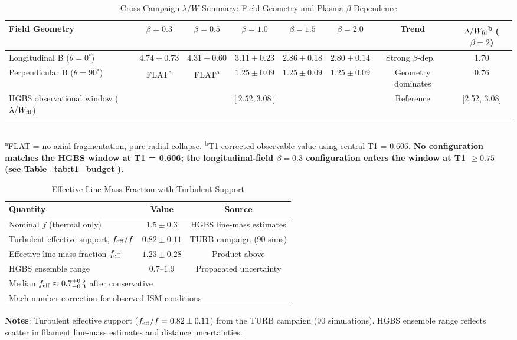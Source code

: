 \documentclass[twoside,twocolumn]{mnras}
\begin{document}
\begin{table}
\caption{Cross-Campaign $\lambda/W$ Summary: Field Geometry and Plasma $\beta$ Dependence}
\label{tab:cross_campaign}
\small
\begin{tabular}{lccccccc}
\toprule
Field Geometry & $\beta = 0.3$ & $\beta = 0.5$ & $\beta = 1.0$ & $\beta = 1.5$ & $\beta = 2.0$ & Trend & $\lambda/W_{\rm fil}$\textsuperscript{b} ($\beta=2$) \\
\midrule
Longitudinal B ($\theta = 0^\circ$) & $4.74 \pm 0.73$ & $4.31 \pm 0.60$ & $3.11 \pm 0.23$ & $2.86 \pm 0.18$ & $2.80 \pm 0.14$ & Strong $\beta$-dep.\ & 1.70 \\
Perpendicular B ($\theta = 90^\circ$) & FLAT\textsuperscript{a} & FLAT\textsuperscript{a} & $1.25 \pm 0.09$ & $1.25 \pm 0.09$ & $1.25 \pm 0.09$ & Geometry dominates & 0.76 \\
\midrule
HGBS observational window ($\lambda/W_{\rm fil}$) & \multicolumn{5}{c}{$[2.52, 3.08]$} & Reference & [2.52, 3.08] \\
\bottomrule
\end{tabular}
\\[2pt]
\footnotesize
\textsuperscript{a}FLAT = no axial fragmentation, pure radial collapse. \hspace{1em}
\textsuperscript{b}T1-corrected observable value using central T1 = 0.606. \textbf{No configuration matches the HGBS window at T1 = 0.606; the longitudinal-field $\beta=0.3$ configuration enters the window at T1 $\geq 0.75$ (see Table~\ref{tab:t1_budget}).}
\end{table}

\begin{table}
\caption{Effective Line-Mass Fraction with Turbulent Support}
\label{tab:feff}
\small
\begin{tabular}{lcc}
\toprule
Quantity & Value & Source \\
\midrule
Nominal $f$ (thermal only) & $1.5 \pm 0.3$ & HGBS line-mass estimates \\
Turbulent effective support, $f_{\rm eff}/f$ & $0.82 \pm 0.11$ & TURB campaign (90 sims) \\
Effective line-mass fraction $f_{\rm eff}$ & $1.23 \pm 0.28$ & Product above \\
HGBS ensemble range & $0.7$--$1.9$ & Propagated uncertainty \\
\midrule
\multicolumn{3}{l}{\footnotesize Median $f_{\rm eff} \approx 0.7^{+0.5}_{-0.3}$ after conservative}\\
\multicolumn{3}{l}{\footnotesize Mach-number correction for observed ISM conditions}\\
\bottomrule
\end{tabular}
\vspace{0.05in}
\footnotesize
\textbf{Notes}: Turbulent effective support ($f_{\rm eff}/f = 0.82 \pm 0.11$) from the
TURB campaign (90 simulations). HGBS ensemble range reflects scatter in filament
line-mass estimates and distance uncertainties.
\end{table}
\end{document}
